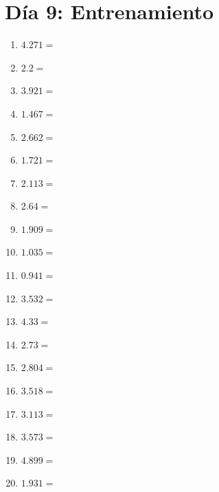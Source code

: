 \documentclass[12pt]{article}
\begin{document}
\section*{Día 9: Entrenamiento}
\begin{enumerate}
\item \large $ 4.271 = $ \vspace{1.5cm}
\item \large $ 2.2 = $ \vspace{1.5cm}
\item \large $ 3.921 = $ \vspace{1.5cm}
\item \large $ 1.467 = $ \vspace{1.5cm}
\item \large $ 2.662 = $ \vspace{1.5cm}
\item \large $ 1.721 = $ \vspace{1.5cm}
\item \large $ 2.113 = $ \vspace{1.5cm}
\item \large $ 2.64 = $ \vspace{1.5cm}
\item \large $ 1.909 = $ \vspace{1.5cm}
\item \large $ 1.035 = $ \vspace{1.5cm}
\newpage
\item \large $ 0.941 = $ \vspace{1.5cm}
\item \large $ 3.532 = $ \vspace{1.5cm}
\item \large $ 4.33 = $ \vspace{1.5cm}
\item \large $ 2.73 = $ \vspace{1.5cm}
\item \large $ 2.804 = $ \vspace{1.5cm}
\item \large $ 3.518 = $ \vspace{1.5cm}
\item \large $ 3.113 = $ \vspace{1.5cm}
\item \large $ 3.573 = $ \vspace{1.5cm}
\item \large $ 4.899 = $ \vspace{1.5cm}
\item \large $ 1.931 = $ \vspace{1.5cm}

\end{enumerate}
\end{document}
